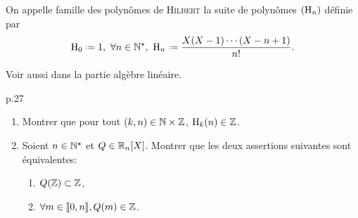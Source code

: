 \begin{defi}
    On appelle famille des polynômes de \textsc{Hilbert} la suite de polynômes $(\mathrm{H}_n)$ définie par
    $$\Hilb_0 \defeq 1,\ \forall n \in \Ne,\ \Hilb_n \defeq \frac{X(X-1)\cdots(X-n+1)}{n!}.$$
\end{defi}

Voir aussi  dans la partie algèbre linéaire. 

\begin{exercice}
    \cite{exos_oraux} p.27
    \begin{enumerate}
        \item Montrer que pour tout $(k, n) \in \mathbb{N} \times \mathbb{Z}$, $\mathrm{H}_k(n) \in \mathbb{Z}$.
        \item Soient $n \in \mathbb{N}^\star$ et $Q \in \mathbb{R}_n[X]$. Montrer que les deux assertions suivantes sont équivalentes:
        \begin{enumerate}[label=(\roman*)]
            \item $Q(\mathbb{Z}) \subset \mathbb{Z}$,
            \item $\forall m \in \llbracket 0, n \rrbracket, Q(m) \in \mathbb{Z}$.
        \end{enumerate}
    \end{enumerate}
\end{exercice}